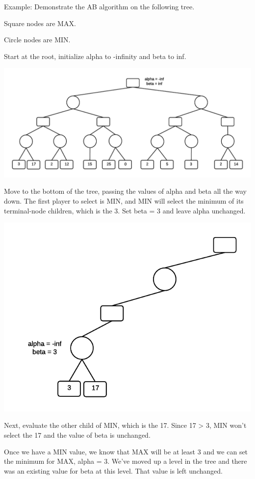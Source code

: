 \documentclass[11pt]{article}
\makeatletter
\def\maxwidth{\ifdim\Gin@nat@width>\linewidth\linewidth
    \else\Gin@nat@width\fi}
\let\Oldincludegraphics\includegraphics
\renewcommand{\includegraphics}[1]{\Oldincludegraphics[width=.8\maxwidth]{#1}}
\makeatother
\begin{document}
    Example: Demonstrate the AB algorithm on the following tree.

Square nodes are MAX.

Circle nodes are MIN.

Start at the root, initialize alpha to -infinity and beta to inf.

\includegraphics{./img/ABExample1_Corrected.png}

Move to the bottom of the tree, passing the values of alpha and beta all
the way down. The first player to select is MIN, and MIN will select the
minimum of its terminal-node children, which is the 3. Set beta = 3 and
leave alpha unchanged.

\includegraphics{img/ABExample2.png}

Next, evaluate the other child of MIN, which is the 17. Since 17
\textgreater{} 3, MIN won't select the 17 and the value of beta is
unchanged.

Once we have a MIN value, we know that MAX will be at least 3 and we can
set the minimum for MAX, alpha = 3. We've moved up a level in the tree
and there was an existing value for beta at this level. That value is
left unchanged.
\end{document}
